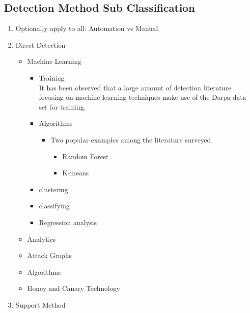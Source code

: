 \documentclass[10pt]{IEEEtran}
\begin{document}
\subsection{Detection Method Sub Classification}
\begin{enumerate}
    \item Optionally apply to all: Automation vs Manual.
    \item Direct Detection
        \begin{itemize}
            \item Machine Learning\cite{buczak2016survey}\cite{dua2016data} 
            \begin{itemize}
                \item Training\\
                It has been observed that a large amount of detection literature focusing on machine learning techniques make use of the Darpa data set for training. 
                \item Algorithms
                \begin{itemize}
                    \item Two popular examples among the literature surveyed.
                    \begin{itemize}
                        \item Random Forest \cite{singh2014big}
                        \item K-means\cite{asif2011filtering}\cite{hajamydeen2016unsupervised}
                    \end{itemize}
                \end{itemize}
                \item clustering \cite{asif2011filtering}   
                \item classifying
                \item Regression analysis
            \end{itemize}
            \item Analytics\cite{cardenas2013big}
                \item Attack Graphs\cite{abraham2015predictive}
                \item Algorithms\cite{kim2013detection}
            \item Honey and Canary Technology \cite{jasek2013apt}\cite{saud2015towards}
        \end{itemize}
    \item Support Method
        \begin{itemize}

\end{itemize}
\end{enumerate}
\end{document}
